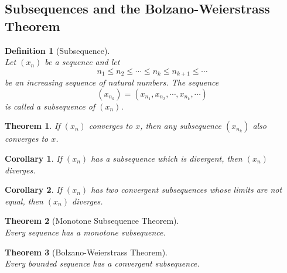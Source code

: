 \documentclass[12pt]{article}
\newtheorem{definition}{Definition}[section]
\newtheorem{theorem}{Theorem}[section]
\newtheorem{corollary}{Corollary}[section]
\theoremstyle{definition}
\begin{document}
\subsection{Subsequences and the Bolzano-Weierstrass Theorem}
\begin{definition}[Subsequence]
\hfill\\\normalfont Let $(x_n)$ be a sequence and let
\[
n_1\leq n_2\leq \cdots\leq n_k\leq n_{k+1}\leq \cdots
\]
be an increasing sequence of natural numbers. The sequence
\[
(x_{n_k})=(x_{n_1},x_{n_2},\cdots,x_{n_k},\cdots)
\]
is called a subsequence of $(x_n)$.
\end{definition}
\begin{theorem}\normalfont If $(x_n)$ converges to $x$, then any subsequence $(x_{n_k})$ also converges to $x$.
\end{theorem}
\begin{corollary}\normalfont If $(x_n)$ has a subsequence which is divergent, then $(x_n)$ diverges.
\end{corollary}
\begin{corollary}\normalfont If $(x_n)$ has two convergent subsequences whose limits are not equal, then $(x_n)$ diverges.
\end{corollary}
\begin{theorem}[Monotone Subsequence Theorem]
\hfill\\\normalfont Every sequence has a monotone subsequence.
\end{theorem}
\begin{theorem}[Bolzano-Weierstrass Theorem]
\hfill\\\normalfont Every bounded sequence has a convergent subsequence.
\end{theorem}
\end{document}

